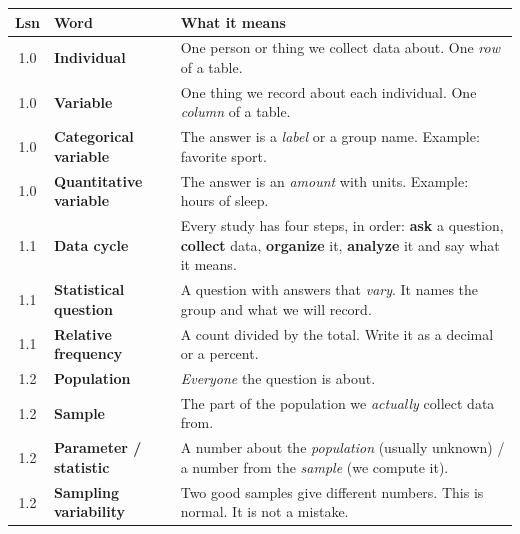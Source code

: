 \documentclass[10pt]{article}
\begin{document}
\vspace{3pt}
\renewcommand{\arraystretch}{1.15}
\boxguard[14]
\begin{tabularx}{\linewidth}{@{} c >{\raggedright\arraybackslash\bfseries}p{3.4cm} X @{}}
\rowcolor{frost}
\textbf{Lsn} & \textbf{Word} & \textbf{What it means} \\
\midrule
1.0 & Individual & One person or thing we collect data about. One \emph{row} of a table. \\
1.0 & Variable & One thing we record about each individual. One \emph{column} of a table. \\
1.0 & Categorical variable & The answer is a \emph{label} or a group name. Example: favorite
      sport. \\
1.0 & Quantitative variable & The answer is an \emph{amount} with units. Example: hours of
      sleep. \\
1.1 & Data cycle & Every study has four steps, in order: \textbf{ask} a question,
      \textbf{collect} data, \textbf{organize} it, \textbf{analyze} it and say what it means. \\
1.1 & Statistical question & A question with answers that \emph{vary}. It names the group and
      what we will record. \\
1.1 & Relative frequency & A count divided by the total. Write it as a decimal or a percent. \\
1.2 & Population & \emph{Everyone} the question is about. \\
1.2 & Sample & The part of the population we \emph{actually} collect data from. \\
1.2 & Parameter / statistic & A number about the \emph{population} (usually unknown) / a
      number from the \emph{sample} (we compute it). \\
1.2 & Sampling variability & Two good samples give different numbers. This is normal. It is
      not a mistake. \\
\end{tabularx}
\end{document}
